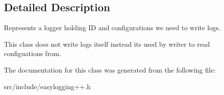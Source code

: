 \subsection{Detailed Description}
Represents a logger holding ID and configurations we need to write logs. 

This class does not write logs itself instead its used by writer to read configuations from. 

The documentation for this class was generated from the following file\+:\begin{DoxyCompactItemize}
\item 
src/include/easylogging++.\+h\end{DoxyCompactItemize}
